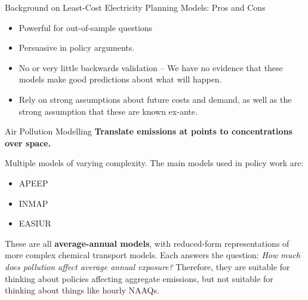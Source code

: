 \documentclass{beamer}
\begin{document}
\begin{frame}{Background on Least-Cost Electricity Planning Models: Pros and Cons}
    \begin{itemize}
        \item Powerful for out-of-sample questions

        \item Persuasive in policy arguments.

        \item No or very little backwards validation -- We have no evidence that these models make good predictions about what will happen.

        \item Rely on strong assumptions about future costs and demand, as well as the strong assumption that these are known ex-ante.
    \end{itemize}
\end{frame}

\begin{frame}{Air Pollution Modelling}
\textbf{Translate emissions at points to concentrations over space.} 

\vspace{.3cm}

Multiple models of varying complexity. The main models used in policy work are:
\begin{itemize}
    \item APEEP
    \item INMAP
    \item EASIUR
\end{itemize}

\vspace{.3cm}

These are all \textbf{average-annual models}, with reduced-form representations of more complex chemical transport models. Each answers the question: \textit{How much does pollution affect average annual exposure?} Therefore, they are suitable for thinking about policies affecting aggregate emissions, but not suitable for thinking about things like hourly NAAQs.
\end{frame}
\end{document}
